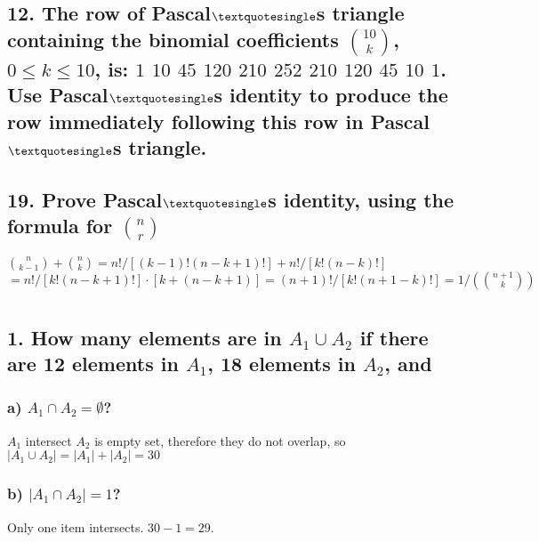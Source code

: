 \documentclass[11pt, oneside]{article} %
\numberwithin{equation}{section} %
\numberwithin{figure}{section} %
\numberwithin{table}{section} %
\begin{document}

\subsection{12. The row of Pascal$\textquotesingle$s triangle containing the binomial coefficients  ${10 \choose k}$, $0 \leq k \leq 10$, is:
$1$  $10$  $45$  $120$  $210$  $252$  $210$  $120$  $45$  $10$  $1$. Use Pascal$\textquotesingle$s identity to produce the row immediately following this row in Pascal$\textquotesingle$s triangle.}


\subsection{19. Prove Pascal$\textquotesingle$s identity, using the formula for ${n \choose r}$}
${n \choose k-1} + {n \choose k} = n!/[(k-1)!(n-k+1)!] + n!/[k!(n-k)!]$ \\
$= n!/[k!(n-k+1)!] \cdot [k+(n-k+1)] = (n+1)!/[k!(n+1-k)!] = 1/({n+1 \choose k})$


\section{}
\subsection{1. How many elements are in $A_1 \cup A_2$ if there are 12 elements in ${A_1}$, 18 elements in $A_2$, and}
\subsubsection{a) $A_1 \cap A_2 = \emptyset $?}
$A_1$ intersect $A_2$ is empty set, therefore they do not overlap, so $|A_1 \cup A_2| = |A_1|+ |A_2| = 30$
\subsubsection{b) $|A_1 \cap A_2|=1$?}
Only one item intersects. $30 - 1 = 29$.
\end{document}

